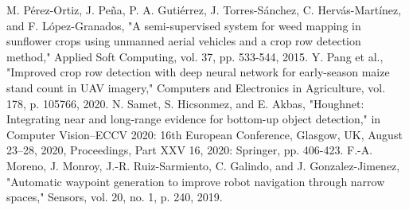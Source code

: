 \documentclass[conference]{IEEEtran}
\begin{document}
\begin{thebibliography}{00}
		 M. Pérez-Ortiz, J. Peña, P. A. Gutiérrez, J. Torres-Sánchez, C. Hervás-Martínez, and F. López-Granados, "A semi-supervised system for weed mapping in sunflower crops using unmanned aerial vehicles and a crop row detection method," Applied Soft Computing, vol. 37, pp. 533-544, 2015.
		 Y. Pang et al., "Improved crop row detection with deep neural network for early-season maize stand count in UAV imagery," Computers and Electronics in Agriculture, vol. 178, p. 105766, 2020.
		 N. Samet, S. Hicsonmez, and E. Akbas, "Houghnet: Integrating near and long-range evidence for bottom-up object detection," in Computer Vision–ECCV 2020: 16th European Conference, Glasgow, UK, August 23–28, 2020, Proceedings, Part XXV 16, 2020: Springer, pp. 406-423.
		 F.-A. Moreno, J. Monroy, J.-R. Ruiz-Sarmiento, C. Galindo, and J. Gonzalez-Jimenez, "Automatic waypoint generation to improve robot navigation through narrow spaces," Sensors, vol. 20, no. 1, p. 240, 2019.
	\end{thebibliography}
	
	\vspace{12pt}
	
	
\end{document}

